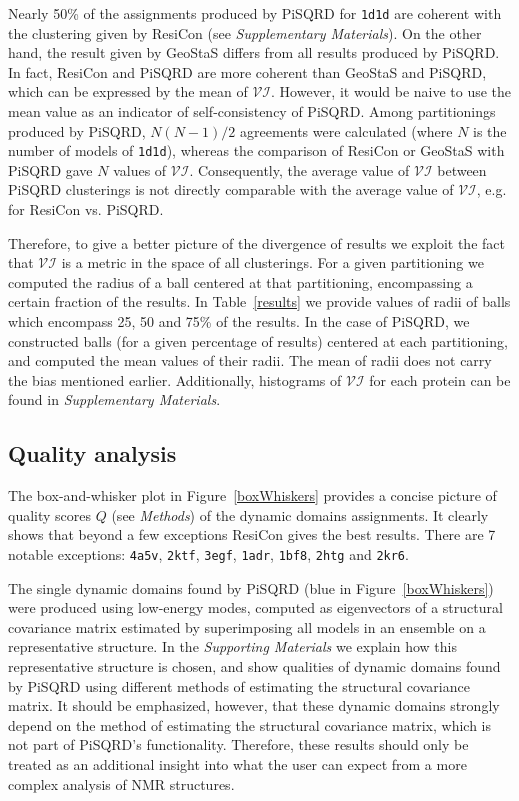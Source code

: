 \documentclass[a4paper,11pt,twoside]{book}%
\begin{document}
Nearly 50\% of the assignments produced by PiSQRD for \texttt{1d1d} are coherent with the clustering given by ResiCon (see \emph{Supplementary Materials}).
On the other hand, the result given by GeoStaS differs from all results produced by PiSQRD.
In fact, ResiCon and PiSQRD are more coherent than GeoStaS and PiSQRD, which can be expressed by the mean of $\mathcal{VI}$.
However, it would be naive to use the mean value as an indicator of self-consistency of PiSQRD.
Among partitionings produced by PiSQRD, $N(N-1)/2$ agreements were calculated (where $N$ is the number of models of \texttt{1d1d}), whereas the comparison of ResiCon or GeoStaS with PiSQRD gave $N$ values of $\mathcal{VI}$.
Consequently, the average value of $\mathcal{VI}$ between PiSQRD clusterings is not directly comparable with the average value of $\mathcal{VI}$, e.g. for ResiCon vs. PiSQRD.

Therefore, to give a better picture of the divergence of results we exploit the fact that $\mathcal{VI}$ is a metric in the space of all clusterings.
For a given partitioning we computed the radius of a ball %
 centered at that partitioning, encompassing a certain fraction of the results.
In Table~\ref{results} we provide values of radii of balls which encompass 25, 50 and 75\% of the results.
In the case of PiSQRD, we constructed balls (for a given percentage of results) centered at each partitioning, and computed the mean values of their radii.
The mean of radii does not carry the bias mentioned earlier.
Additionally, histograms of $\mathcal{VI}$ for each protein can be found in \emph{Supplementary Materials}.

\subsection*{Quality analysis}

The box-and-whisker plot in Figure~\ref{boxWhiskers} provides a concise picture of quality scores $Q$ (see \emph{Methods}) of the dynamic domains assignments.
It clearly shows that beyond a few exceptions ResiCon gives the best results.
There are 7 notable exceptions: \texttt{4a5v}, \texttt{2ktf}, \texttt{3egf}, \texttt{1adr}, \texttt{1bf8}, \texttt{2htg} and \texttt{2kr6}.

The single dynamic domains found by PiSQRD (blue in Figure~\ref{boxWhiskers}) were produced using low-energy modes, computed as eigenvectors of a structural covariance matrix estimated by superimposing all models in an ensemble on a representative structure.
In the \emph{Supporting Materials} we explain how this representative structure is chosen, and show qualities of dynamic domains found by PiSQRD using different methods of estimating the structural covariance matrix.
It should be emphasized, however, that these dynamic domains strongly depend on the method of estimating the structural covariance matrix, which is not part of PiSQRD's functionality.
Therefore, these results should only be treated as an additional insight into what the user can expect from a more complex analysis of NMR structures.
\end{document}
